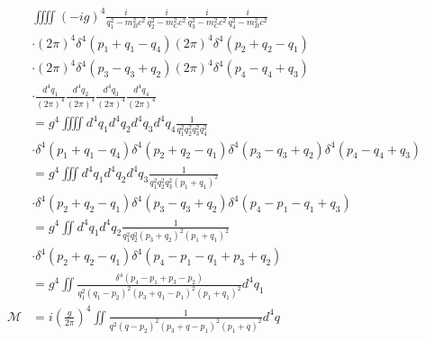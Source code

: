 \documentclass{article}
\begin{document}
\begin{equation}
    \begin{split}
        & \iiiint \left(-ig\right)^4 \frac{i}{q_1^2 - m_B^2c^2}\frac{i}{q_2^2 - m_C^2c^2}\frac{i}{q_3^2 - m_C^2c^2}\frac{i}{q_4^2 - m_B^2c^2} \\
        & \cdot \left(2\pi\right)^4\delta^4\left(p_1 + q_1 - q_4\right)\left(2\pi\right)^4\delta^4\left(p_2 + q_2 - q_1\right) \\
        & \cdot \left(2\pi\right)^4\delta^4\left(p_3 - q_3 + q_2\right)\left(2\pi\right)^4\delta^4\left(p_4 - q_4 + q_3\right) \\
        & \cdot \frac{d^4q_1}{(2\pi)^4}\frac{d^4q_2}{\left(2\pi\right)^4}\frac{d^4q_3}{\left(2\pi\right)^4}\frac{d^4q_4}{\left(2\pi\right)^4} \\
        & = g^4 \iiiint d^4q_1d^4q_2d^4q_3d^4q_4 \frac{1}{q_1^2q_2^2q_3^2q_4^2} \\
        & \cdot \delta^4\left(p_1 + q_1 - q_4\right)\delta^4\left(p_2 + q_2 - q_1\right) \delta^4\left(p_3 - q_3 + q_2\right)\delta^4\left(p_4 - q_4 + q_3\right) \\
        & = g^4 \iiint d^4q_1d^4q_2d^4q_3 \frac{1}{q_1^2q_2^2q_3^2\left(p_1 + q_1\right)^2} \\
        & \cdot \delta^4\left(p_2 + q_2 - q_1\right) \delta^4\left(p_3 - q_3 + q_2\right)\delta^4\left(p_4 - p_1 - q_1 + q_3\right) \\
        & = g^4 \iint d^4q_1d^4q_2\frac{1}{q_1^2q_2^2\left(p_3 + q_2\right)^2\left(p_1 + q_1\right)^2} \\
        & \cdot \delta^4\left(p_2 + q_2 - q_1\right) \delta^4\left(p_4 - p_1 - q_1 + p_3 + q_2\right) \\
        & = g^4 \iint \frac{ \delta^4\left(p_4 - p_1 + p_3 - p_2\right)}{q_1^2\left(q_1 - p_2\right)^2\left(p_3 + q_1 - p_1\right)^2\left(p_1 + q_1\right)^2} d^4q_1 \\
        \mathcal{M} & = i\left(\frac{g}{2\pi}\right)^4 \iint \frac{1}{q^2(q - p_2)^2\left(p_3 + q - p_1\right)^2\left(p_1 + q\right)^2} d^4q \\
    \end{split}
\end{equation}
\clearpage
\end{document}
